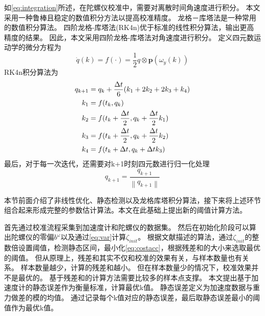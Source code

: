\documentclass[
  type=master
]{gdutthesis}
\begin{document}
如\autoref{eq:integration}所述，在陀螺仪校准中，需要对离散时间角速度进行积分。
本文采用一种鲁棒且稳定的数值积分方法以提高校准精度。
龙格－库塔法是一种常用的数值积分算法\cite{andrle2013geometric}。
四阶龙格-库塔法(RK4n)优于标准的线性积分算法，输出更高精度的结果。
因此，本文采用四阶龙格-库塔法对角速度进行积分。
定义四元数运动学的微分方程为
\begin{equation}
	\dot{q}(k)=f(\cdot )=\frac{1}{2} q \otimes \mathbf{p}(\omega_y(k))
\end{equation}
RK4n积分算法为
\begin{equation}\label{eq:rk4}
	\begin{aligned}
		q_{k+1} &= q_k + \frac{\Delta t}{6}(k_1 + 2 k_2 + 2 k_3 + k_4)\\
		k_1 &= f(t_k , q_k)\\
		k_2 &= f(t_k + \frac{\Delta t}{2},q_k + \frac{\Delta t}{2} k_1)\\
		k_3 &= f(t_k + \frac{\Delta t}{2},q_k + \frac{\Delta t}{2} k_2)\\
		k_4 &= f(t_k + \Delta t, q_k + \Delta t k_3)\vspace{1ex}
	\end{aligned}
\end{equation}
最后，对于每一次迭代，还需要对k+1时刻四元数进行归一化处理
\begin{equation}
	q_{k+1} = \frac{q_{k+1}}{\left\|q_{k+1}\right\|}
\end{equation}

本节前面介绍了非线性优化、静态检测以及龙格库塔积分算法，接下来将上述环节组合起来形成完整的参数估计算法。本文在此基础上提出新的阈值计算方法。

首先通过校准流程采集到加速度计和陀螺仪的数据集。
然后在初始化阶段可以算出陀螺仪的零偏$b^\omega$以及通过\autoref{eq:var}计算$\zeta_{init}$。
根据文献\parencite{tedaldi2014robust}描述的算法，通过$\zeta_{init}$的整数倍设置阈值，检测静态区间，最小化\autoref{eq:costacc}，根据残差和的大小来选取最优的阈值。
但从原理上，残差和其实不仅和校准的效果有关，与样本数量也有关系。
样本数量越少，计算的残差和越小。
但在样本数量少的情况下，校准效果并不是最优的。
基于残差和的计算方法需要比较多的样本点支撑。
本文提出基于加速度计的静态误差作为衡量标准，计算最优k值。
静态误差定义为加速度数据与重力做差的模的均值。
通过记录每个k值对应的静态误差，最后取静态误差最小的阈值作为最优k值。
\end{document}
